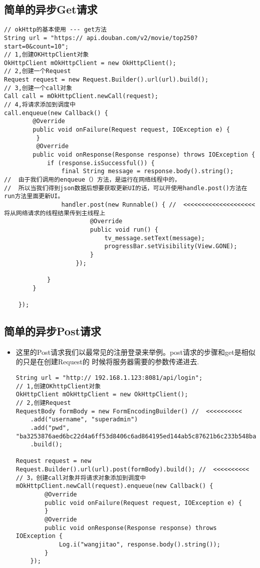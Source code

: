 \documentclass[9pt, b5paper]{article}
\begin{document}
\subsection{简单的异步Get请求}
\label{sec-3-1}
\begin{verbatim}
// okHttp的基本使用 --- get方法
String url = "https:// api.douban.com/v2/movie/top250?start=0&count=10";
// 1,创建OKHttpClient对象
OkHttpClient mOkHttpClient = new OkHttpClient();
// 2,创建一个Request
Request request = new Request.Builder().url(url).build();
// 3,创建一个call对象
Call call = mOkHttpClient.newCall(request);
// 4,将请求添加到调度中
call.enqueue(new Callback() {
        @Override
        public void onFailure(Request request, IOException e) {
         }
         @Override
        public void onResponse(Response response) throws IOException {
            if (response.isSuccessful()) {
                final String message = response.body().string();
//  由于我们调用的enqueue（）方法，是运行在网络线程中的，
//  所以当我们得到json数据后想要获取更新UI的话，可以开使用handle.post()方法在run方法里面更新UI。                
                handler.post(new Runnable() { //  <<<<<<<<<<<<<<<<<<<<  将从网络请求的线程结果传到主线程上
                        @Override
                        public void run() {
                            tv_message.setText(message);
                            progressBar.setVisibility(View.GONE);
                        }
                    });
 
            }
        }
 
    });
\end{verbatim}
\subsection{简单的异步Post请求}
\label{sec-3-2}
\begin{itemize}
\item 这里的Post请求我们以最常见的注册登录来举例。post请求的步骤和get是相似的只是在创建Request的 时候将服务器需要的参数传递进去.
\begin{verbatim}
String url = "http:// 192.168.1.123:8081/api/login";
// 1,创建OKhttpClient对象
OkHttpClient mOkHttpClient = new OkHttpClient();
// 2,创建Request
RequestBody formBody = new FormEncodingBuilder() //  <<<<<<<<<< 
    .add("username", "superadmin")
    .add("pwd", "ba3253876aed6bc22d4a6ff53d8406c6ad864195ed144ab5c87621b6c233b548baeae6956df346ec8c17f5ea10f35ee3cbc514797ed7ddd3145464e2a0bab413")
    .build();
 
Request request = new Request.Builder().url(url).post(formBody).build(); //  <<<<<<<<<< 
// 3，创建call对象并将请求对象添加到调度中
mOkHttpClient.newCall(request).enqueue(new Callback() {
        @Override
        public void onFailure(Request request, IOException e) {
        }
        @Override
        public void onResponse(Response response) throws IOException {
            Log.i("wangjitao", response.body().string());
        }
    });
\end{verbatim}
\end{itemize}
\end{document}
